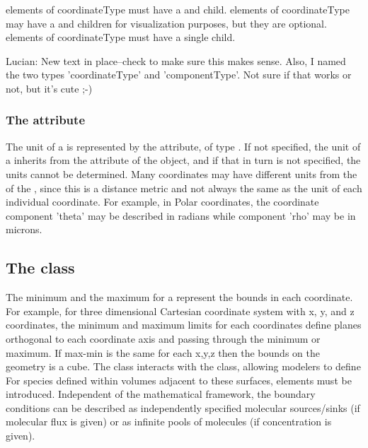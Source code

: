 \CoordinateComponent elements of coordinateType  must have a  and  child.  \CoordinateComponent elements of coordinateType  may have a  and  children for visualization purposes, but they are optional.  \CoordinateComponent elements of coordinateType  must have a single  child.

{\color{red} Lucian: \notice New text in place--check to make sure this makes sense.  Also, I named the two types 'coordinateType' and 'componentType'.  Not sure if that works or not, but it's cute ;-)}


\subsubsection{The  attribute}
The unit of a \CoordinateComponent is represented by the  attribute, of type .  If not specified, the unit of a \CoordinateComponent inherits from the  attribute of the \Model object, and if that in turn is not specified, the \CoordinateComponent units cannot be determined.  Many coordinates may have different units from the  of the \Model, since this is a distance metric and not always the same as the unit of each individual coordinate.  For example, in Polar coordinates, the coordinate component 'theta' may be described in radians while component 'rho' may be in microns.  


\subsection{The  class}
\label{Boundary-class}
The minimum and the maximum for a \CoordinateComponent represent the bounds in each coordinate.  For example, for three dimensional Cartesian coordinate system with x, y, and z coordinates, the minimum and maximum limits for each coordinates define planes orthogonal to each coordinate axis and passing through the minimum or maximum.  If max-min is the same for each x,y,z then the bounds on the geometry is a cube.  The \Boundary class interacts with the \BoundaryCondition class, allowing modelers to define For species defined within volumes adjacent to these surfaces, \BoundaryCondition elements must be introduced.  Independent of the mathematical framework, the boundary conditions can be described as independently specified molecular sources/sinks (if molecular flux is given) or as infinite pools of molecules (if concentration is given).

